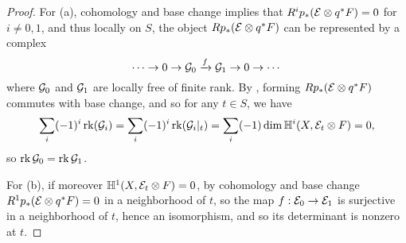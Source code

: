 \begin{proof}
    For (a), cohomology and base change implies that $R^i p_*(\mathcal{E} \otimes q^* F) = 0$ for $i \neq 0,1$, and thus locally on $S$, the object $R p_*(\mathcal{E} \otimes q^*F)$ can be represented by a complex
    \[ \cdots \to 0 \to \mathcal{G}_0 \xrightarrow{f} \mathcal{G}_1 \to 0 \to \cdots \]
    where $\mathcal{G}_0$ and $\mathcal{G}_1$ are locally free of finite rank. By \cite[\href{https://stacks.math.columbia.edu/tag/0B91}{Tag 0B91}]{stacks-project}, forming $R p_*(\mathcal{E} \otimes q^*F)$ commutes with base change, and so for any $t \in S$, we have 
    \[ \sum_i (-1)^i \operatorname{\mathrm{rk}}(\mathcal{G}_i) = \sum_i (-1)^i \operatorname{\mathrm{rk}}(\mathcal{G}_i|_t) = \sum_i (-1) \dim \mathbb{H}^i(X, \mathcal{E}_t \otimes F) = 0, \]
    so $\operatorname{\mathrm{rk}} \mathcal{G}_0 = \operatorname{\mathrm{rk}} \mathcal{G}_1$.
    
    For (b), if moreover $\mathbb{H}^1(X, \mathcal{E}_t \otimes F) = 0$, by cohomology and base change $R^1 p_*(\mathcal{E} \otimes q^*F) = 0$ in a neighborhood of $t$, so the map $f: \mathcal{E}_0 \to \mathcal{E}_1$ is surjective in a neighborhood of $t$, hence an isomorphism, and so its determinant is nonzero at $t$.
\end{proof}

